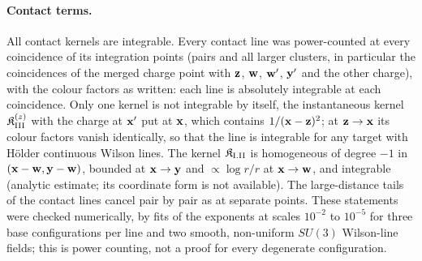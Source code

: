 \paragraph{Contact terms.} All contact kernels are integrable. Every contact line was power-counted at every coincidence of its integration points (pairs and all larger clusters, in particular the coincidences of the merged charge point with $\mathbf{z}$, $\mathbf{w}$, $\mathbf{w}'$, $\mathbf{y}'$ and the other charge), with the colour factors as written: each line is absolutely integrable at each coincidence. Only one kernel is not integrable by itself, the instantaneous kernel $\mathfrak K^{(z)}_{\rm III}$ with the charge at $\mathbf{x}'$ put at $\mathbf{x}$, which contains $1/(\mathbf{x}-\mathbf{z})^2$; at $\mathbf{z}\to\mathbf{x}$ its colour factors vanish identically, so that the line is integrable for any target with H\"older continuous Wilson lines. The kernel $\mathfrak K_{\rm I.II}$ is homogeneous of degree $-1$ in $(\mathbf{x}-\mathbf{w},\mathbf{y}-\mathbf{w})$, bounded at $\mathbf{x}\to\mathbf{y}$ and $\propto\log r/r$ at $\mathbf{x}\to\mathbf{w}$, and integrable (analytic estimate; its coordinate form is not available). The large-distance tails of the contact lines cancel pair by pair as at separate points. These statements were checked numerically, by fits of the exponents at scales $10^{-2}$ to $10^{-5}$ for three base configurations per line and two smooth, non-uniform $SU(3)$ Wilson-line fields; this is power counting, not a proof for every degenerate configuration.
\par\endgroup
